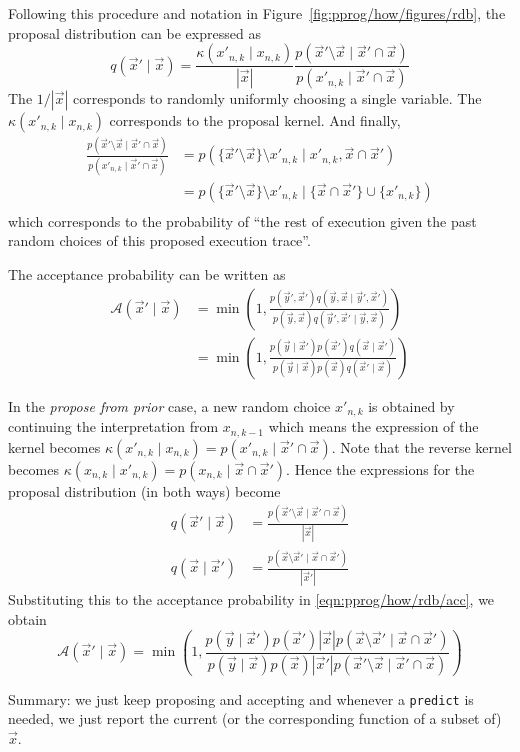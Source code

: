 Following this procedure and notation in Figure~\ref{fig:pprog/how/figures/rdb}, the proposal distribution can be expressed as
\begin{equation}
	q(\vec x' \mid \vec x)	= \frac{\kappa(x'_{n, k} \mid x_{n, k})}{|\vec x|} \frac{p(\vec x' \setminus \vec x \mid \vec x' \cap \vec x)}{p(x'_{n, k} \mid \vec x' \cap \vec x)}
\end{equation}
The $1 / {|\vec x|}$ corresponds to randomly uniformly choosing a single variable. The $\kappa(x'_{n, k} \mid x_{n, k})$ corresponds to the proposal kernel. And finally,
\begin{align*}
	\frac{p(\vec x' \setminus \vec x \mid \vec x' \cap \vec x)}{p(x'_{n, k} \mid \vec x' \cap \vec x)}	&= p\left(\{\vec x' \setminus \vec x\} \setminus x'_{n, k} \mid x'_{n, k}, \vec x \cap \vec x'\right) \\
																										&= p\left(\{\vec x' \setminus \vec x\} \setminus x'_{n, k} \mid \{\vec x \cap \vec x'\} \cup \{x'_{n, k}\}\right) \\
\end{align*}
which corresponds to the probability of ``the rest of execution given the past random choices of this proposed execution trace''.

The acceptance probability can be written as
\begin{align}
	\mathcal A(\vec x' \mid \vec x)	&= \min\left(1, \frac{p(\vec y', \vec x') q(\vec y, \vec x \mid \vec y', \vec x')}{p(\vec y, \vec x) q(\vec y', \vec x' \mid \vec y, \vec x)}\right) \nonumber\\
									&= \min\left(1, \frac{p(\vec y \mid \vec x') p(\vec x') q(\vec x \mid \vec x')}{p(\vec y \mid \vec x) p(\vec x) q(\vec x' \mid \vec x)}\right) \label{eqn:pprog/how/rdb/acc}
\end{align}

In the \emph{propose from prior} case, a new random choice $x'_{n, k}$ is obtained by continuing the interpretation from $x_{n, k - 1}$ which means the expression of the kernel becomes $\kappa(x'_{n, k} \mid x_{n, k}) = p(x'_{n, k} \mid \vec x' \cap \vec x)$. Note that the reverse kernel becomes $\kappa(x_{n, k} \mid x'_{n, k}) = p(x_{n, k} \mid \vec x \cap \vec x')$. Hence the expressions for the proposal distribution (in both ways) become
\begin{align*}
	q(\vec x' \mid \vec x)	&= \frac{p(\vec x' \setminus \vec x \mid \vec x' \cap \vec x)}{|\vec x|} \\
	q(\vec x \mid \vec x')	&= \frac{p(\vec x \setminus \vec x' \mid \vec x \cap \vec x')}{|\vec x'|}
\end{align*}
Substituting this to the acceptance probability in \eqref{eqn:pprog/how/rdb/acc}, we obtain
\begin{equation}
	\mathcal A(\vec x' \mid \vec x) = \min\left(1, \frac{p(\vec y \mid \vec x') p(\vec x') |\vec x| p(\vec x \setminus \vec x' \mid \vec x \cap \vec x')}{p(\vec y \mid \vec x) p(\vec x) |\vec x'| p(\vec x' \setminus \vec x \mid \vec x' \cap \vec x)}\right)
\end{equation}

Summary: we just keep proposing and accepting and whenever a \verb!predict! is needed, we just report the current (or the corresponding function of a subset of) $\vec x$.